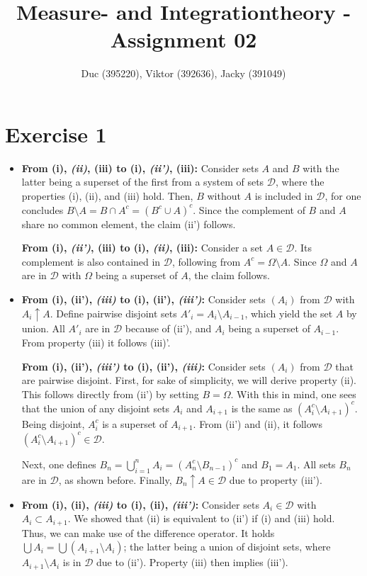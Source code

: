 \documentclass{article}
\title{Measure- and Integrationtheory - Assignment 02}
\author{Duc (395220), Viktor (392636), Jacky (391049)}
\begin{document}
\maketitle

\section*{Exercise 1}
\begin{itemize}
    \item \textbf{From (i), \emph{(ii)}, (iii) to (i), \emph{(ii')}, (iii):} Consider sets $A$ and $B$ with the latter being a superset of the first from a system of sets $\mathcal D$, where the properties (i), (ii), and (iii) hold. Then, $B$ without $A$ is included in $\mathcal D$, for one concludes $B \setminus A = B \cap A^c = (B^c \cup A)^c$. Since the complement of $B$ and $A$ share no common element, the claim (ii') follows.

    \textbf{From (i), \emph{(ii')}, (iii) to (i), \emph{(ii)}, (iii):} Consider a set $A \in \mathcal D$. Its complement is also contained in $\mathcal D$, following from $A^c = \Omega \setminus A$. Since $\Omega$ and $A$ are in $\mathcal D$ with $\Omega$ being a superset of $A$, the claim follows.

    \item \textbf{From (i), (ii'), \emph{(iii)} to (i), (ii'), \emph{(iii')}:} Consider sets $(A_i)$ from $\mathcal D$ with $A_i \uparrow A$. Define pairwise disjoint sets $A'_i = A_i \setminus A_{i-1}$, which yield the set $A$ by union. All $A'_i$ are in $\mathcal D$ because of (ii'), and $A_i$ being a superset of $A_{i-1}$. From property (iii) it follows (iii)'.
    
    \textbf{From (i), (ii'), \emph{(iii')} to (i), (ii'), \emph{(iii)}:} Consider sets $(A_i)$ from $\mathcal D$ that are pairwise disjoint. First, for sake of simplicity, we will derive property (ii). This follows directly from (ii') by setting $B = \Omega$. With this in mind, one sees that the union of any disjoint sets $A_i$ and $A_{i+1}$ is the same as $(A_i^c \setminus A_{i+1})^c$. Being disjoint, $A_i^c$ is a superset of $A_{i+1}$. From (ii') and (ii), it follows $(A_i^c \setminus A_{i+1})^c \in \mathcal D$. 

    Next, one defines $B_n = \bigcup^n_{i=1} A_i = (A_n^c \setminus B_{n-1})^c$ and $B_1 = A_1$. All sets $B_n$ are in $\mathcal D$, as shown before. Finally, $B_n \uparrow A \in \mathcal D$ due to property (iii').

    \item \textbf{From (i), (ii), \emph{(iii)} to (i), (ii), \emph{(iii')}:} Consider sets $A_i \in \mathcal D$ with $A_i \subset A_{i+1}$. We showed that (ii) is equivalent to (ii') if (i) and (iii) hold. Thus, we can make use of the difference operator. It holds $\bigcup A_i = \bigcup (A_{i+1} \setminus A_i)$; the latter being a union of disjoint sets, where $A_{i+1} \setminus A_i$ is in $\mathcal D$ due to (ii'). Property (iii) then implies (iii').
    

\end{itemize}
\end{document}
